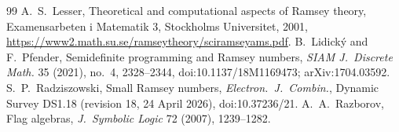 \documentclass[11pt]{article}
\theoremstyle{spacedplain}
\theoremstyle{spaceddef}
\theoremstyle{spacedremark}
\begin{document}
\begin{thebibliography}{99}
 A.~S.~Lesser, Theoretical and computational aspects of Ramsey theory, Examensarbeten i Matematik 3, Stockholms Universitet, 2001, \url{https://www2.math.su.se/ramseytheory/sciramseyams.pdf}.
 B.~Lidick\'y and F.~Pfender, Semidefinite programming and Ramsey numbers, \emph{SIAM J.\ Discrete Math.} 35 (2021), no.~4, 2328--2344, doi:10.1137/18M1169473; arXiv:1704.03592.
 S.~P.~Radziszowski, Small Ramsey numbers, \emph{Electron.\ J.\ Combin.}, Dynamic Survey DS1.18 (revision 18, 24 April 2026), doi:10.37236/21.
 A.~A.~Razborov, Flag algebras, \emph{J.\ Symbolic Logic} 72 (2007), 1239--1282.
\end{thebibliography}
\end{document}

